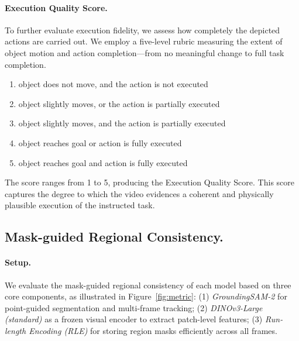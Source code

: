 \paragraph{Execution Quality Score.}
To further evaluate execution fidelity, we assess how completely the depicted actions are carried out.
We employ a five-level rubric measuring the extent of object motion and action completion—from no meaningful change to full task completion.
\begin{enumerate}
    \item object does not move, and the action is not executed
    \item object slightly moves, or the action is partially executed
    \item object slightly moves, and the action is partially executed
    \item object reaches goal or action is fully executed
    \item object reaches goal and action is fully executed
\end{enumerate}
The score ranges from 1 to 5, producing the Execution Quality Score.
This score captures the degree to which the video evidences a coherent and physically plausible execution of the instructed task.

\subsection{Mask-guided Regional Consistency.}
\paragraph{Setup.} 
We evaluate the mask-guided regional consistency of each model based on three core components, as illustrated in Figure~\ref{fig:metric}:
(1) \textit{GroundingSAM-2} for point-guided segmentation and multi-frame tracking;  
(2) \textit{DINOv3-Large (standard)} as a frozen visual encoder to extract patch-level features;  
(3) \textit{Run-length Encoding (RLE)} for storing region masks efficiently across all frames.  
